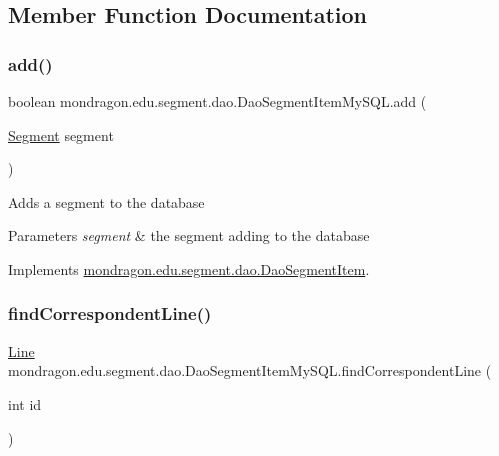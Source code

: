 \subsection{Member Function Documentation}
\mbox{\label{classmondragon_1_1edu_1_1segment_1_1dao_1_1_dao_segment_item_my_s_q_l_a8a602c05b2ff07c8b27a3e90214fb761}} 
\subsubsection{\texorpdfstring{add()}{add()}}
{\footnotesize\ttfamily boolean mondragon.\+edu.\+segment.\+dao.\+Dao\+Segment\+Item\+My\+S\+Q\+L.\+add (\begin{DoxyParamCaption}\item[{\mbox{\hyperlink{classmondragon_1_1edu_1_1clases_1_1_segment}{Segment}}}]{segment }\end{DoxyParamCaption})\hspace{0.3cm}{\ttfamily [inline]}}

Adds a segment to the database 
\begin{DoxyParams}{Parameters}
{\em segment} & the segment adding to the database \\
\hline
\end{DoxyParams}


Implements \mbox{\hyperlink{interfacemondragon_1_1edu_1_1segment_1_1dao_1_1_dao_segment_item}{mondragon.\+edu.\+segment.\+dao.\+Dao\+Segment\+Item}}.

\mbox{\label{classmondragon_1_1edu_1_1segment_1_1dao_1_1_dao_segment_item_my_s_q_l_a0ee35d6b3aa569e60f8e9dd8714341d7}} 
\subsubsection{\texorpdfstring{findCorrespondentLine()}{findCorrespondentLine()}}
{\footnotesize\ttfamily \mbox{\hyperlink{classmondragon_1_1edu_1_1clases_1_1_line}{Line}} mondragon.\+edu.\+segment.\+dao.\+Dao\+Segment\+Item\+My\+S\+Q\+L.\+find\+Correspondent\+Line (\begin{DoxyParamCaption}\item[{int}]{id }\end{DoxyParamCaption})\hspace{0.3cm}{\ttfamily [inline]}}


